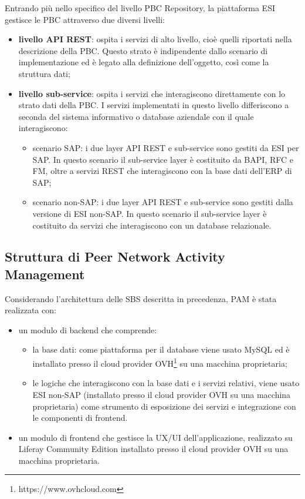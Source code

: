 Entrando più nello specifico del livello \ac{PBC} Repository, la piattaforma \ac{ESI} gestisce le \ac{PBC}
attraverso due diversi livelli:
\begin{itemize}
    \item \textbf{livello API REST}: ospita i servizi di alto livello, cioè quelli riportati nella descrizione
    della \ac{PBC}. Questo strato è indipendente dallo scenario di implementazione ed è legato alla
    definizione dell’oggetto, così come la struttura dati;
    \item \textbf{livello sub-service}: ospita i servizi che interagiscono direttamente con lo strato dati
    della \ac{PBC}. I servizi implementati in questo livello differiscono a seconda del sistema informativo
    o database aziendale con il quale interagiscono:
    \begin{itemize}
        \item scenario SAP: i due layer API REST e sub-service sono gestiti da \ac{ESI} per SAP.
        In questo scenario il sub-service layer è costituito da BAPI, RFC e FM, oltre a servizi REST
        che interagiscono con la base dati dell'\ac{ERP} di SAP;
        \item scenario non-SAP: i due layer API REST e sub-service sono gestiti dalla versione
        di \ac{ESI} non-SAP. In questo scenario il sub-service layer è costituito da servizi che
        interagiscono con un database relazionale.
    \end{itemize}
\end{itemize}

    \subsection{Struttura di Peer Network Activity Management}
    Considerando l’architettura delle \ac{SBS} descritta in precedenza, \ac{PAM} è stata realizzata con:
    \begin{itemize}
        \item un modulo di backend che comprende:
        \begin{itemize}
            \item la base dati: come piattaforma per il database viene usato MySQL ed è installato presso il
            cloud provider OVH\footnote{https://www.ovhcloud.com} su una macchina proprietaria;
            \item le logiche che interagiscono con la base dati e i servizi relativi, viene usato
            \ac{ESI} non-SAP (installato presso il cloud provider OVH su una macchina proprietaria) come
            strumento di esposizione dei servizi e integrazione con le componenti di frontend.
        \end{itemize}
        \item un modulo di frontend che gestisce la UX/UI dell’applicazione, realizzato su
        Liferay Community Edition installato presso il cloud provider OVH su una macchina proprietaria.
    \end{itemize}
  
